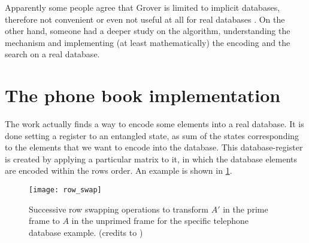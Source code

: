 \bigskip

Apparently some people agree that Grover is limited to implicit databases, therefore not convenient or even not useful at all for real databases \cite{1425397, Zalka2000, stackexchange1, stackexchange2, stackexchange3}. On the other hand, someone had a deeper study on the algorithm, understanding the mechanism and implementing (at least mathematically) the encoding and the search on a real database. \cite{alsing2011grover}

%


\section{The phone book implementation}

The work \cite{alsing2011grover} actually finds a way to encode some elements into a real database. It is done setting a register to an entangled state, as sum of the states corresponding to the elements that we want to encode into the database. This database-register is created by applying a particular matrix to it, in which the database elements are encoded within the rows order. An example is shown in \cref{fig:row_swap}.

\begin{figure}
	\centering
	\texttt{[image: row\_swap]}
	\caption{Successive row swapping operations to transform $A'$ in the prime frame to $A$ in the unprimed frame for the specific telephone database example. (credits to \cite{alsing2011grover})}
	\label{fig:row_swap}
\end{figure}

%





